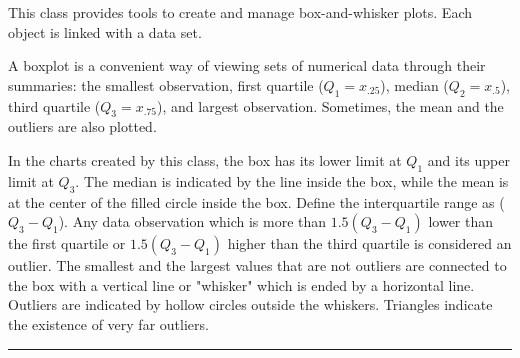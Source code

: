 
This class provides tools to create and manage box-and-whisker  plots.
Each  object is linked with a
 data set.

A boxplot is a convenient way of viewing sets of numerical data through their
summaries: the smallest observation, first quartile ($Q_1 = x_{.25}$), median
 ($Q_2 = x_{.5}$), third quartile ($Q_3 = x_{.75}$), and largest observation.
Sometimes, the mean and the outliers are also plotted.

In the charts created by this class, the box has its lower limit at $Q_1$
and its upper limit at $Q_3$. The median is indicated by the line inside the box,
while the mean is at the center of the filled circle inside the box.
Define the interquartile range as ($Q_3 - Q_1$).
Any data observation which is more than $1.5(Q_3 - Q_1)$ lower than the first
quartile or $1.5(Q_3 - Q_1)$ higher than the third quartile is considered an
outlier. The smallest and the largest values that are not outliers are connected
to the box with a vertical line or "whisker" which is ended by a horizontal line.
Outliers are indicated by hollow circles outside the whiskers. Triangles
indicate the existence of very far outliers.

\bigskip\hrule

